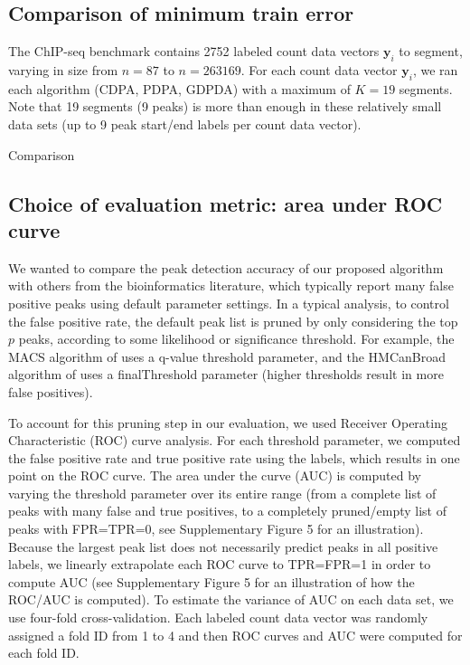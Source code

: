 \documentclass[aoas]{imsart}
\begin{document}
\subsection{Comparison of minimum train error}

The ChIP-seq benchmark contains 2752 labeled count data vectors
$\mathbf y_i$ to segment, varying in size from $n=87$ to
$n=263169$. For each count data vector $\mathbf y_i$, we ran each
algorithm (CDPA, PDPA, GDPDA) with a maximum of $K=19$ segments. Note
that 19 segments (9 peaks) is more than enough in these relatively
small data sets (up to 9 peak start/end labels per count data vector).

\begin{table}
  \centering 
  \caption{Comparison}
  \label{tab:min-train-error}
\end{table}

\subsection{Choice of evaluation metric: area under ROC curve}

We wanted to compare the peak detection accuracy of our proposed
algorithm with others from the bioinformatics literature, which
typically report many false positive peaks using default parameter
settings. 
In a typical analysis, to control the false
positive rate, the default peak list is pruned by only considering the
top $p$ peaks, according to some likelihood or significance
threshold. For example, the MACS algorithm of \citet{MACS} uses a
q-value threshold parameter, and the HMCanBroad algorithm of
\citet{HMCan} uses a finalThreshold parameter (higher thresholds
result in more false positives).

To account for this pruning step in our evaluation, we used Receiver
Operating Characteristic (ROC) curve analysis. For each threshold
parameter, we computed the false positive rate and true positive rate
using the labels, which results in one point on the ROC curve. The
area under the curve (AUC) is computed by varying the threshold
parameter over its entire range (from a complete list of peaks with
many false and true positives, to a completely pruned/empty list of
peaks with FPR=TPR=0, see Supplementary Figure 5 for an illustration).
Because the largest peak list does not necessarily predict peaks in
all positive labels, we linearly extrapolate each ROC curve to
TPR=FPR=1 in order to compute AUC (see Supplementary Figure 5 for an
illustration of how the ROC/AUC is computed). To estimate the variance
of AUC on each data set, we use four-fold cross-validation. Each
labeled count data vector was randomly assigned a fold ID from 1 to 4
and then ROC curves and AUC were computed for each fold ID.
\end{document}
